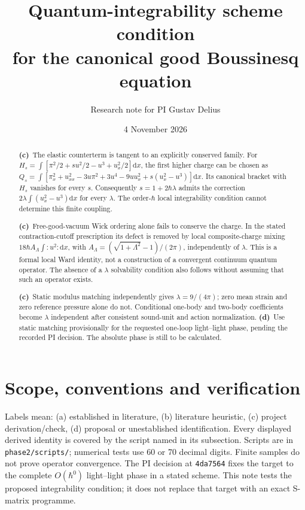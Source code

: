 \documentclass[11pt,a4paper]{article}
\title{Quantum-integrability scheme condition\\for the canonical good Boussinesq equation}
\author{Research note for PI Gustav Delius}
\date{4 November 2026}
\newcommand{\C}{\textbf{(c)}\ }
\newcommand{\D}{\textbf{(d)}\ }
\newcommand{\dd}{\mathrm d}
\newcommand{\file}[1]{\nolinkurl{#1}}
\begin{document}
\maketitle
\begin{abstract}
\C The elastic counterterm is tangent to an explicitly conserved family.
For $H_s=\int[\pi^2/2+su^2/2-u^3+u_x^2/2]\dd x$, the first higher
charge can be chosen as
$Q_s=\int[\pi_x^2+u_{xx}^2-3u\pi^2+3u^4-9uu_x^2+s(u_x^2-u^3)]\dd x$.
Its canonical bracket with $H_s$ vanishes for every $s$.
Consequently $s=1+2\hbar\lambda$ admits the correction
$2\lambda\int(u_x^2-u^3)\dd x$ for every $\lambda$.
The order-$\hbar$ local integrability condition cannot determine this
finite coupling.

\C Free-good-vacuum Wick ordering alone fails to conserve the charge.
In the stated contraction-cutoff prescription its defect is removed by
local composite-charge mixing $18\hbar A_\Lambda\int:u^2:\dd x$, with
$A_\Lambda=(\sqrt{1+\Lambda^2}-1)/(2\pi)$, independently of $\lambda$.
This is a formal local Ward identity, not a construction of a convergent
continuum quantum operator. The absence of a $\lambda$ solvability
condition also follows without assuming that such an operator exists.

\C Static modulus matching independently gives $\lambda=9/(4\pi)$;
zero mean strain and zero reference pressure alone do not. Conditional
one-body and two-body coefficients become $\lambda$ independent after
consistent sound-unit and action normalization.
\D Use static matching provisionally for the requested one-loop
light--light phase, pending the recorded PI decision. The absolute phase
is still to be calculated.
\end{abstract}

\section{Scope, conventions and verification}
Labels mean: (a) established in literature, (b) literature heuristic,
(c) project derivation/check, (d) proposal or unestablished identification.
Every displayed derived identity is covered by the script named in its
subsection. Scripts are in \file{phase2/scripts/}; numerical tests use
60 or 70 decimal digits. Finite samples do not prove operator convergence.
The PI decision at \file{4da7564} fixes the target to the complete
$O(\hbar^0)$ light--light phase in a stated scheme. This note tests the
proposed integrability condition; it does not replace that target with
an exact S-matrix programme.
\end{document}
